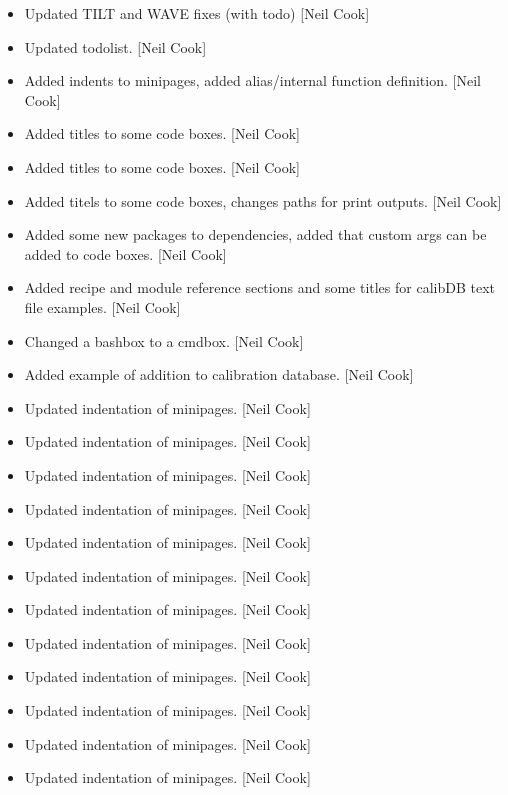 \documentclass[a4paper,10pt,english]{report}
\begin{document}
\begin{itemize}
\item {} 
Updated TILT and WAVE fixes (with todo) {[}Neil Cook{]}

\item {} 
Updated todolist. {[}Neil Cook{]}

\item {} 
Added indents to minipages, added alias/internal function definition.
{[}Neil Cook{]}

\item {} 
Added titles to some code boxes. {[}Neil Cook{]}

\item {} 
Added titles to some code boxes. {[}Neil Cook{]}

\item {} 
Added titels to some code boxes, changes paths for print outputs.
{[}Neil Cook{]}

\item {} 
Added some new packages to dependencies, added that custom args can be
added to code boxes. {[}Neil Cook{]}

\item {} 
Added recipe and module reference sections and some titles for calibDB
text file examples. {[}Neil Cook{]}

\item {} 
Changed a bashbox to a cmdbox. {[}Neil Cook{]}

\item {} 
Added example of addition to calibration database. {[}Neil Cook{]}

\item {} 
Updated indentation of minipages. {[}Neil Cook{]}

\item {} 
Updated indentation of minipages. {[}Neil Cook{]}

\item {} 
Updated indentation of minipages. {[}Neil Cook{]}

\item {} 
Updated indentation of minipages. {[}Neil Cook{]}

\item {} 
Updated indentation of minipages. {[}Neil Cook{]}

\item {} 
Updated indentation of minipages. {[}Neil Cook{]}

\item {} 
Updated indentation of minipages. {[}Neil Cook{]}

\item {} 
Updated indentation of minipages. {[}Neil Cook{]}

\item {} 
Updated indentation of minipages. {[}Neil Cook{]}

\item {} 
Updated indentation of minipages. {[}Neil Cook{]}

\item {} 
Updated indentation of minipages. {[}Neil Cook{]}

\item {} 
Updated indentation of minipages. {[}Neil Cook{]}

\end{itemize}
\end{document}
